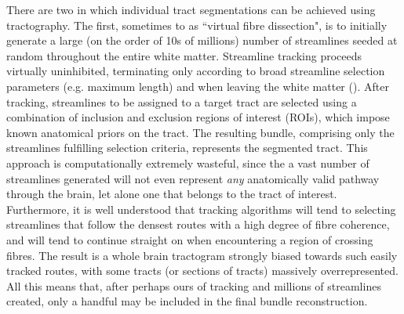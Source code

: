 There are two  in which individual tract segmentations can be achieved using tractography.
The first, sometimes  to as ``virtual fibre dissection", is to initially generate a large (on the order of 10s of millions) number of streamlines seeded at random throughout the entire white matter.
Streamline tracking proceeds virtually uninhibited, terminating only according to broad streamline selection parameters (e.g. maximum length) and when leaving the white matter ().
After tracking, streamlines to be assigned to a target tract are selected using a combination of inclusion and exclusion regions of interest (ROIs), which impose known anatomical priors on the tract.
The resulting bundle, comprising only the streamlines fulfilling selection criteria, represents the segmented tract.
This approach is computationally extremely wasteful, since the a vast number of streamlines generated will not even represent \textit{any} anatomically valid pathway through the brain, let alone one that belongs to the tract of interest.
Furthermore, it is well understood that tracking algorithms will tend to selecting streamlines that follow the densest routes with a high degree of fibre coherence, and will tend to continue straight on when encountering a region of crossing fibres.
The result is a whole brain tractogram strongly biased towards such easily tracked routes, with some tracts (or sections of tracts) massively overrepresented.
All this means that, after perhaps ours of tracking and millions of streamlines created, only a handful may be included in the final bundle reconstruction.

